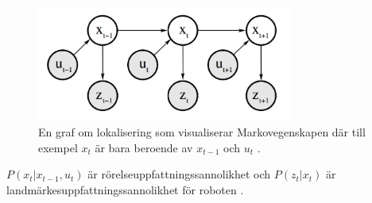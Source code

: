 \begin{figure}[ht]
    \begin{center}
    \includegraphics[width=0.75\textwidth]{markov.JPG}
    \caption{En graf om lokalisering som visualiserar Markovegenskapen där till exempel $x_t$ är bara beroende av $x_{t-1}$ och $u_t$ \citep{ProbabilisticRobotics}.}
    \label{markov}
    \end{center}
\end{figure}

$P(x_t|x_{t-1}, u_{t})$ är rörelseuppfattningssannolikhet och $P(z_t|x_t)$ är landmärkesuppfattningssannolikhet för roboten \citep{ProbabilisticRobotics}. 

